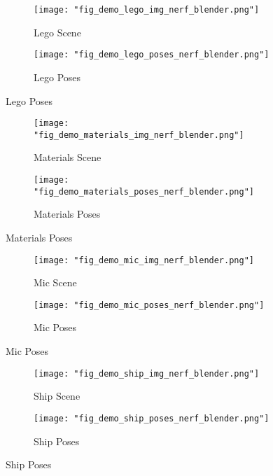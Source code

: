 \begin{figure}
    \centering
        \begin{subfigure}{0.48\linewidth}
            \texttt{[image: "fig\_demo\_lego\_img\_nerf\_blender.png"]}
            \caption{Lego Scene}
        \end{subfigure}
        \begin{subfigure}{0.48\linewidth}
            \texttt{[image: "fig\_demo\_lego\_poses\_nerf\_blender.png"]}
            \caption{Lego Poses}
        \end{subfigure}
\end{figure}


\begin{figure}
    \centering
        \begin{subfigure}{0.48\linewidth}
            \texttt{[image: "fig\_demo\_materials\_img\_nerf\_blender.png"]}
            \caption{Materials Scene}
        \end{subfigure}
        \begin{subfigure}{0.48\linewidth}
            \texttt{[image: "fig\_demo\_materials\_poses\_nerf\_blender.png"]}
            \caption{Materials Poses}
        \end{subfigure}
\end{figure}

\begin{figure}
    \centering
        \begin{subfigure}{0.48\linewidth}
            \texttt{[image: "fig\_demo\_mic\_img\_nerf\_blender.png"]}
            \caption{Mic Scene}
        \end{subfigure}
        \begin{subfigure}{0.48\linewidth}
            \texttt{[image: "fig\_demo\_mic\_poses\_nerf\_blender.png"]}
            \caption{Mic Poses}
        \end{subfigure}
\end{figure}


\begin{figure}
    \centering
        \begin{subfigure}{0.48\linewidth}
            \texttt{[image: "fig\_demo\_ship\_img\_nerf\_blender.png"]}
            \caption{Ship Scene}
        \end{subfigure}
        \begin{subfigure}{0.48\linewidth}
            \texttt{[image: 
                "fig\_demo\_ship\_poses\_nerf\_blender.png"]}
            \caption{Ship Poses}
        \end{subfigure}
\end{figure}
